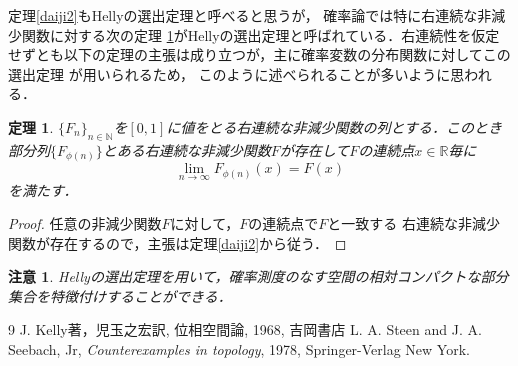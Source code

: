 \documentclass[leqno, 12pt]{jsarticle}
\newtheorem{thm}{定理}
\newtheorem*{rmk}{注意}
\newcommand{\nn}{\mathbb{N}}
\newcommand{\rr}{\mathbb{R}}
\begin{document}
定理\ref{daiji2}もHellyの選出定理と呼べると思うが，
確率論では特に右連続な非減少関数に対する次の定理 \ref{daiji3}がHellyの選出定理と呼ばれている．右連続性を仮定せずとも以下の定理の主張は成り立つが，主に確率変数の分布関数に対してこの選出定理
が用いられるため，
このように述べられることが多いように思われる．
\begin{thm}\label{daiji3}
$\{F_n\}_{n\in \nn}$を$[0, 1]$に値をとる右連続な非減少関数の列とする．このとき部分列$\{F_{\phi(n)}\}$とある右連続な非減少関数$F$が存在して$F$の連続点$x\in \rr$毎に
\[
\lim_{n\to \infty}F_{\phi(n)}(x)=F(x)
\]
を満たす．
\end{thm}
\begin{proof}
任意の非減少関数$F$に対して，$F$の連続点で$F$と一致する
右連続な非減少関数が存在するので，主張は定理\ref{daiji2}から従う．
\end{proof}

\begin{rmk}
Hellyの選出定理を用いて，確率測度のなす空間の相対コンパクトな部分集合を特徴付けすることができる．
\end{rmk}






















	
\begin{thebibliography}{9}
J. Kelly著，児玉之宏訳, 
位相空間論, 
1968, 吉岡書店
L. A. Steen and J. A. Seebach, Jr, 
\textit{Counterexamples in topology}, 
1978, 
Springer-Verlag New York. 

\end{thebibliography}




			
\end{document}
